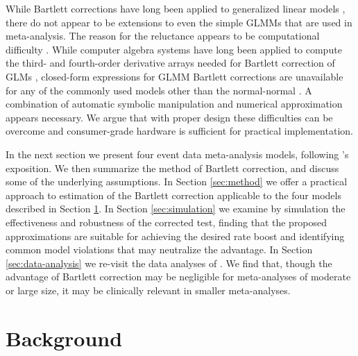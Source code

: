 \documentclass[12pt]{article}
\begin{document}
While Bartlett corrections have long been applied to generalized
linear models \citep{cordeiro:83}, there do not appear to be
extensions to even the simple GLMMs that are used in
meta-analysis. The reason for the reluctance appears to
be computational difficulty \citep{hanada:26}. While computer algebra
systems have long been applied to compute the third- and fourth-order
derivative arrays needed for Bartlett correction of GLMs
\citep{cordeiro:93,mccullagh:87,andrews:00}, closed-form expressions
for GLMM Bartlett corrections are unavailable for any of the commonly
used models other than the normal-normal
\citep{noma:11,michael:ma-bartlett}. A combination of automatic
symbolic manipulation and numerical approximation appears
necessary. %
We argue that with
proper design these difficulties can be overcome and consumer-grade
hardware is sufficient for practical implementation.

In the next section we present four event data meta-analysis models,
following \citet{stijnen:10}'s exposition. We then summarize the method of
Bartlett correction, and discuss some of the underlying
assumptions. In Section \ref{sec:method} we offer a practical approach
to estimation of the Bartlett correction applicable to the four
models described in Section \ref{sec:background}. In Section
\ref{sec:simulation} we examine by simulation the effectiveness and robustness of
the corrected test, finding that the proposed approximations are suitable for achieving the desired rate boost and identifying common model violations that may neutralize the advantage. In Section \ref{sec:data-analysis} we
re-visit the data analyses of \citet{stijnen:10}. We find that, though the
advantage of Bartlett correction may be  negligible for 
meta-analyses of moderate or large size, it may be clinically relevant in smaller meta-analyses.


\section{Background}
\label{sec:background}

\end{document}
